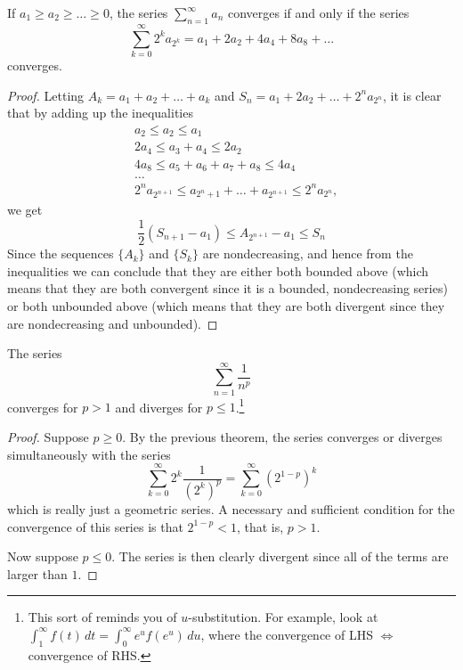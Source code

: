   \begin{theorem}
    \label{thm:cauchy-condensation-test}
    If $a_1 \geq a_2 \geq \ldots \geq 0$, the series $\sum_{n=1}^\infty a_n$ converges if and only if the series 
    \begin{equation}
      \sum_{k=0}^\infty 2^k a_{2^k} = a_1 + 2 a_2 + 4a_4 + 8a_8 + \ldots 
    \end{equation}
    converges. 
  \end{theorem}
  \begin{proof}
    Letting $A_k = a_1 + a_2 + \ldots + a_k$ and $S_n = a_1 + 2a_2 + \ldots + 2^n a_{2^n}$, it is clear that by adding up the inequalities
    \begin{align*}
      & a_2 \leq a_2 \leq a_1 \\
      & 2a_4 \leq a_3 + a_4 \leq 2a_2 \\
      & 4a_8 \leq a_5 + a_6 + a_7 + a_8 \leq 4a_4 \\
      & \ldots \\
      & 2^n a_{2^{n+1}} \leq a_{2^n + 1} + \ldots + a_{2^{n+1}} \leq 2^n a_{2^n}, 
    \end{align*}
    we get
    \begin{equation}
      \frac{1}{2}(S_{n+1} - a_1) \leq A_{2^{n+1}} - a_1 \leq S_n
    \end{equation}
    Since the sequences $\{A_k\}$ and $\{S_k\}$ are nondecreasing, and hence from the inequalities we can conclude that they are either both bounded above (which means that they are both convergent since it is a bounded, nondecreasing series) or both unbounded above (which means that they are both divergent since they are nondecreasing and unbounded). 
  \end{proof}

  \begin{corollary}
    \label{thm:p-series-test}
    The series 
    \begin{equation}
      \sum_{n=1}^\infty \frac{1}{n^p}
    \end{equation}
    converges for $p>1$ and diverges for $p \leq 1$.\footnote{This sort of reminds you of $u$-substitution. For example, look at $\int_1^\infty f(t) \,dt = \int_0^\infty e^u f(e^u)\,du$, where the convergence of LHS $\iff$ convergence of RHS.}
  \end{corollary}
  \begin{proof}
    Suppose $p\geq 0$. By the previous theorem, the series converges or diverges simultaneously with the series 
    \begin{equation}
      \sum_{k=0}^\infty 2^k \frac{1}{(2^k)^p} = \sum_{k=0}^\infty (2^{1-p})^k
    \end{equation}
    which is really just a geometric series. A necessary and sufficient condition for the convergence of this series is that $2^{1-p} < 1$, that is, $p>1$. 

    Now suppose $p \leq 0$. The series is then clearly divergent since all of the terms are larger than $1$. 
  \end{proof}

